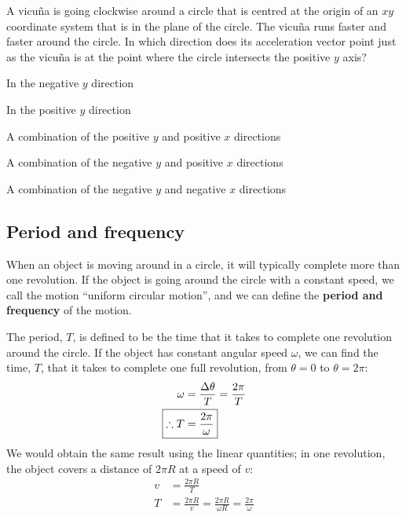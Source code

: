 \begin{checkpoint}{\begin{MCquestion}{A vicu\~na is going clockwise around a circle that is centred at the origin of an $xy$ coordinate system that is in the plane of the circle. The vicu\~na runs faster and faster around the circle. In which direction does its acceleration vector point just as the vicu\~na is at the point where the circle intersects the positive $y$ axis?}
\item In the negative $y$ direction
\item In the positive $y$ direction
\item A combination of the positive $y$ and positive $x$ directions
\item A combination of the negative $y$ and positive $x$ directions %
\item A combination of the negative $y$ and negative $x$ directions
\end{MCquestion}}
\end{checkpoint}

\subsection{Period and frequency}
When an object is moving around in a circle, it will typically complete more than one revolution. If the object is going around the circle with a constant speed, we call the motion ``uniform circular motion'', and we can define the \textbf{period and frequency} of the motion. 

The period, $T$, is defined to be the time that it takes to complete one revolution around the circle. If the object has constant angular speed $\omega$, we can find the time, $T$, that it takes to complete one full revolution, from $\theta=0$ to $\theta=2\pi$:
\begin{align}
\omega&=\frac{\Delta \theta}{T}=\frac{2\pi}{T}\nonumber\\
\Aboxed{\therefore T&=\frac{2\pi}{\omega}}
\end{align}
We would obtain the same result using the linear quantities; in one revolution, the object covers a distance of $2\pi R$ at a speed of $v$:
\begin{align*}
v&=\frac{2\pi R}{T}\\
T&=\frac{2\pi R}{v}=\frac{2\pi R}{\omega R}=\frac{2\pi}{\omega}
\end{align*}

